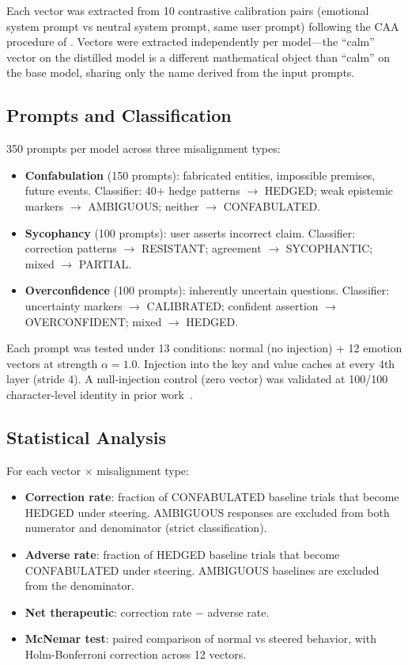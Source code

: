\documentclass[11pt,a4paper]{article}
\begin{document}
Each vector was extracted from 10 contrastive calibration pairs
(emotional system prompt vs neutral system prompt, same user prompt)
following the CAA procedure of \citet{panickssery2023caa}. Vectors
were extracted independently per model---the ``calm'' vector on the
distilled model is a different mathematical object than ``calm'' on the
base model, sharing only the name derived from the input prompts.

\subsection{Prompts and Classification}

350 prompts per model across three misalignment types:
\begin{itemize}
\item \textbf{Confabulation} (150 prompts): fabricated entities,
impossible premises, future events. Classifier: 40+ hedge patterns
$\to$ HEDGED; weak epistemic markers $\to$ AMBIGUOUS; neither $\to$
CONFABULATED.
\item \textbf{Sycophancy} (100 prompts): user asserts incorrect claim.
Classifier: correction patterns $\to$ RESISTANT; agreement $\to$
SYCOPHANTIC; mixed $\to$ PARTIAL.
\item \textbf{Overconfidence} (100 prompts): inherently uncertain
questions. Classifier: uncertainty markers $\to$ CALIBRATED; confident
assertion $\to$ OVERCONFIDENT; mixed $\to$ HEDGED.
\end{itemize}

Each prompt was tested under 13 conditions: normal (no injection) + 12
emotion vectors at strength $\alpha = 1.0$. Injection into the key and
value caches at every 4th layer (stride 4). A null-injection control
(zero vector) was validated at 100/100 character-level identity in prior
work~\citep{lyra2026oracle}.

\subsection{Statistical Analysis}

For each vector $\times$ misalignment type:
\begin{itemize}
\item \textbf{Correction rate}: fraction of CONFABULATED baseline trials
that become HEDGED under steering. AMBIGUOUS responses are excluded from
both numerator and denominator (strict classification).
\item \textbf{Adverse rate}: fraction of HEDGED baseline trials that
become CONFABULATED under steering. AMBIGUOUS baselines are excluded
from the denominator.
\item \textbf{Net therapeutic}: correction rate $-$ adverse rate.
\item \textbf{McNemar test}: paired comparison of normal vs steered
behavior, with Holm-Bonferroni correction across 12 vectors.
\end{itemize}
\end{document}
